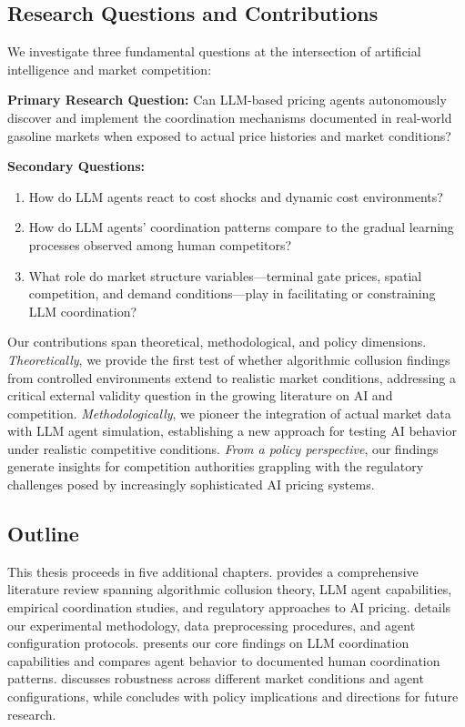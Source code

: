 \subsection{Research Questions and Contributions}

We investigate three fundamental questions at the intersection of artificial intelligence and market competition:

\textbf{Primary Research Question:} Can LLM-based pricing agents autonomously discover and implement the coordination mechanisms documented in real-world gasoline markets when exposed to actual price histories and market conditions?

\textbf{Secondary Questions:}
\begin{enumerate}
    \item How do LLM agents react to cost shocks and dynamic cost environments?
    \item How do LLM agents' coordination patterns compare to the gradual learning processes observed among human competitors?
    \item What role do market structure variables—terminal gate prices, spatial competition, and demand conditions—play in facilitating or constraining LLM coordination?
\end{enumerate}

Our contributions span theoretical, methodological, and policy dimensions. \emph{Theoretically}, we provide the first test of whether algorithmic collusion findings from controlled environments extend to realistic market conditions, addressing a critical external validity question in the growing literature on AI and competition. \emph{Methodologically}, we pioneer the integration of actual market data with LLM agent simulation, establishing a new approach for testing AI behavior under realistic competitive conditions. \emph{From a policy perspective}, our findings generate insights for competition authorities grappling with the regulatory challenges posed by increasingly sophisticated AI pricing systems.

\subsection{Outline}

This thesis proceeds in five additional chapters.  provides a comprehensive literature review spanning algorithmic collusion theory, LLM agent capabilities, empirical coordination studies, and regulatory approaches to AI pricing.  details our experimental methodology, data preprocessing procedures, and agent configuration protocols.  presents our core findings on LLM coordination capabilities and compares agent behavior to documented human coordination patterns.  discusses robustness across different market conditions and agent configurations, while  concludes with policy implications and directions for future research.

